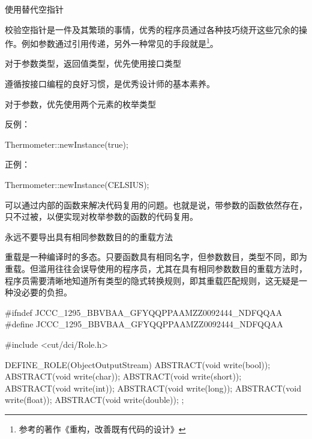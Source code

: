 \begin{content}
\begin{regulation}
使用替代空指针
\end{regulation}

校验空指针是一件及其繁琐的事情，优秀的程序员通过各种技巧绕开这些冗余的操作。例如参数通过引用传递，另外一种常见的手段就是\footnote{参考的著作《重构，改善既有代码的设计》}。

\begin{regulation}
对于参数类型，返回值类型，优先使用接口类型
\end{regulation}

遵循按接口编程的良好习惯，是优秀设计师的基本素养。

\begin{regulation}
对于参数，优先使用两个元素的枚举类型
\end{regulation}

反例：
\begin{leftbar}
\begin{c++}
Thermometer::newInstance(true);
\end{c++}
\end{leftbar}

正例：
\begin{leftbar}
\begin{c++}
Thermometer::newInstance(CELSIUS);
\end{c++}
\end{leftbar}

可以通过内部的函数来解决代码复用的问题。也就是说，带参数的函数依然存在，只不过被，以便实现对枚举参数的函数的代码复用。

\begin{regulation}
永远不要导出具有相同参数数目的的重载方法
\end{regulation}

重载是一种编译时的多态。只要函数具有相同名字，但参数数目，类型不同，即为重载。但滥用往往会误导使用的程序员，尤其在具有相同参数数目的重载方法时，程序员需要清晰地知道所有类型的隐式转换规则，即其重载匹配规则，这无疑是一种没必要的负担。

\begin{leftbar}
\begin{c++}[caption={\ttfamily{io/ObjectOutputStream.h}}]
#ifndef JCCC_1295_BBVBAA_GFYQQPPAAMZZ0092444_NDFQQAA
#define JCCC_1295_BBVBAA_GFYQQPPAAMZZ0092444_NDFQQAA

#include <cut/dci/Role.h>

DEFINE_ROLE(ObjectOutputStream)
{
    ABSTRACT(void write(bool));
    ABSTRACT(void write(char));
    ABSTRACT(void write(short));
    ABSTRACT(void write(int));
    ABSTRACT(void write(long));
    ABSTRACT(void write(float));
    ABSTRACT(void write(double));
};


\end{c++}
\end{leftbar}
\end{content}
